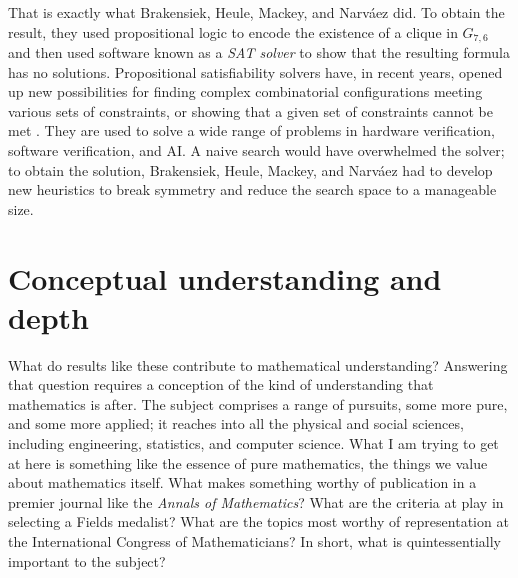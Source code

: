 \documentclass{amsart}
\theoremstyle{definition}
\theoremstyle{remark}
\numberwithin{equation}{section}
\begin{document}
That is exactly what Brakensiek, Heule, Mackey, and Narv\'aez did. To obtain the result, they used propositional logic to encode the existence of a clique in $G_{7,6}$ and then used software known as a \emph{SAT solver} to show that the resulting formula has no solutions. Propositional satisfiability solvers have, in recent years, opened up new possibilities for finding complex combinatorial configurations meeting various sets of constraints, or showing that a given set of constraints cannot be met \cite{biere:et:al:09}. They are used to solve a wide range of problems in hardware verification, software verification, and AI. A naive search would have overwhelmed the solver; to obtain the solution, Brakensiek, Heule, Mackey, and Narv\'aez had to develop new heuristics to break symmetry and reduce the search space to a manageable size.

\section{Conceptual understanding and depth}
\label{section:understanding}

What do results like these contribute to mathematical understanding? Answering that question requires a conception of the kind of understanding that mathematics is after. The subject comprises a range of pursuits, some more pure, and some more applied; it reaches into all the physical and social sciences, including engineering, statistics, and computer science. What I am trying to get at here is something like the essence of pure mathematics, the things we value about mathematics itself. What makes something worthy of publication in a premier journal like the \emph{Annals of Mathematics}? What are the criteria at play in selecting a Fields medalist? What are the topics most worthy of representation at the International Congress of Mathematicians? In short, what is quintessentially important to the subject?
\end{document}
